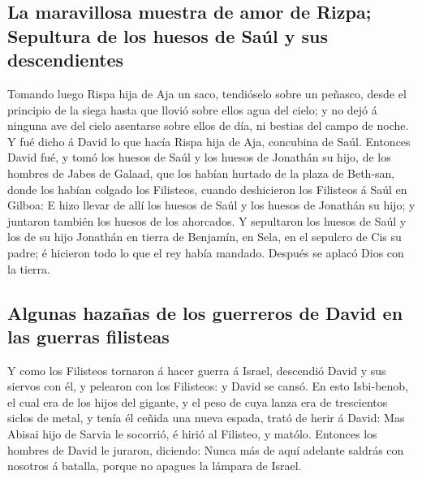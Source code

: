 \hypertarget{la-maravillosa-muestra-de-amor-de-rizpa-sepultura-de-los-huesos-de-sauxfal-y-sus-descendientes}{%
\subsection{La maravillosa muestra de amor de Rizpa; Sepultura de los
huesos de Saúl y sus
descendientes}\label{la-maravillosa-muestra-de-amor-de-rizpa-sepultura-de-los-huesos-de-sauxfal-y-sus-descendientes}}

 Tomando luego Rispa hija de Aja un saco, tendióselo sobre
un peñasco, desde el principio de la siega hasta que llovió sobre ellos
agua del cielo; y no dejó á ninguna ave del cielo asentarse sobre ellos
de día, ni bestias del campo de noche.  Y fué dicho á David
lo que hacía Rispa hija de Aja, concubina de Saúl. 
Entonces David fué, y tomó los huesos de Saúl y los huesos de Jonathán
su hijo, de los hombres de Jabes de Galaad, que los habían hurtado de la
plaza de Beth-san, donde los habían colgado los Filisteos, cuando
deshicieron los Filisteos á Saúl en Gilboa:  E hizo llevar
de allí los huesos de Saúl y los huesos de Jonathán su hijo; y juntaron
también los huesos de los ahorcados.  Y sepultaron los
huesos de Saúl y los de su hijo Jonathán en tierra de Benjamín, en Sela,
en el sepulcro de Cis su padre; é hicieron todo lo que el rey había
mandado. Después se aplacó Dios con la tierra.

\hypertarget{algunas-hazauxf1as-de-los-guerreros-de-david-en-las-guerras-filisteas}{%
\subsection{Algunas hazañas de los guerreros de David en las guerras
filisteas}\label{algunas-hazauxf1as-de-los-guerreros-de-david-en-las-guerras-filisteas}}

 Y como los Filisteos tornaron á hacer guerra á Israel,
descendió David y sus siervos con él, y pelearon con los Filisteos: y
David se cansó.  En esto Isbi-benob, el cual era de los
hijos del gigante, y el peso de cuya lanza era de trescientos siclos de
metal, y tenía él ceñida una nueva espada, trató de herir á David:
 Mas Abisai hijo de Sarvia le socorrió, é hirió al
Filisteo, y matólo. Entonces los hombres de David le juraron, diciendo:
Nunca más de aquí adelante saldrás con nosotros á batalla, porque no
apagues la lámpara de Israel.

